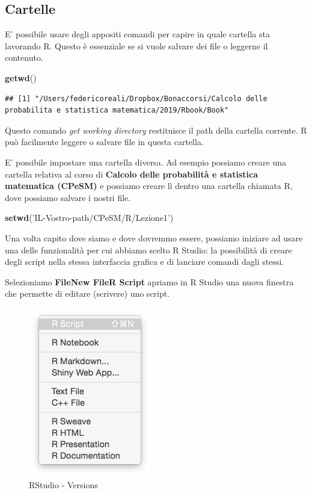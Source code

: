 \documentclass[]{book}
\newenvironment{Shaded}{\begin{snugshade}}{\end{snugshade}}
\newcommand{\KeywordTok}[1]{\textcolor[rgb]{0.13,0.29,0.53}{\textbf{#1}}}
\newcommand{\NormalTok}[1]{#1}
\newcommand{\StringTok}[1]{\textcolor[rgb]{0.31,0.60,0.02}{#1}}
\begin{document}
\hypertarget{cartelle}{%
\subsection{Cartelle}\label{cartelle}}

E' possibile usare degli appositi comandi per capire in quale cartella sta lavorando R. Questo è essenziale se si vuole salvare dei file o leggerne il contenuto.

\begin{Shaded}
\begin{Highlighting}[]
\KeywordTok{getwd}\NormalTok{()}
\end{Highlighting}
\end{Shaded}

\begin{verbatim}
## [1] "/Users/federicoreali/Dropbox/Bonaccorsi/Calcolo delle probabilita e statistica matematica/2019/Rbook/Book"
\end{verbatim}

Questo comando \emph{get working directory} restituisce il path della cartella corrente. R può facilmente leggere o salvare file in questa cartella.

E' possibile impostare una cartella diversa. Ad esempio possiamo creare una cartella relativa al corso di \textbf{Calcolo delle probabilità e statistica matematica (CPeSM)} e possiamo creare lì dentro una cartella chiamata R, dove possiamo salvare i nostri file.

\begin{Shaded}
\begin{Highlighting}[]
\KeywordTok{setwd}\NormalTok{(}\StringTok{'IL-Vostro-path/CPeSM/R/Lezione1'}\NormalTok{)}
\end{Highlighting}
\end{Shaded}

Una volta capito dove siamo e dove dovremmo essere, possiamo iniziare ad usare una delle funzionalità per cui abbiamo scelto R Studio: la possibilità di creare degli script nella stessa interfaccia grafica e di lanciare comandi dagli stessi.

Selezioniamo \textbf{File\textbar{}New File\textbar{}R Script} apriamo in R Studio una nuova finestra che permette di editare (scrivere) uno script.

\begin{figure}
\centering
\includegraphics{./media/Rstudio_NewScript.png}
\caption{RStudio - Versions}
\end{figure}
\end{document}

